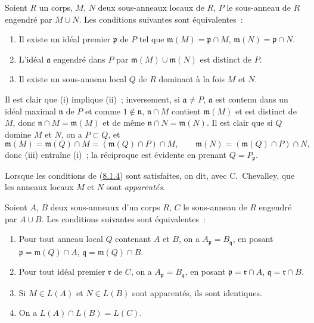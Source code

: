 \begin{lemma}[8.1.4]
\label{I.8.1.4-fr}
Soient $R$ un corps, $M$, $N$ deux sous-anneaux locaux de $R$, $P$ le
sous-anneau de $R$ engendré par $M\cup N$. Les conditions suivantes sont
équivalentes~:
\begin{enumerate}
  \item[(i)] Il existe un idéal premier $\mathfrak p$ de $P$ tel que
    $\mathfrak m(M)=\mathfrak p\cap M$,
    $\mathfrak m(N)=\mathfrak p\cap N$.
  \item[(ii)] L'idéal $\mathfrak a$ engendré dans $P$ par
    $\mathfrak m(M)\cup\mathfrak m(N)$ est distinct de $P$.
  \item[(iii)] Il existe un sous-anneau local $Q$ de $R$ dominant à la fois
    $M$ et $N$.
\end{enumerate}
\end{lemma}

Il est clair que (i) implique (ii)~; inversement, si $\mathfrak a\ne P$,
$\mathfrak a$ est contenu dans un idéal maximal $\mathfrak n$ de $P$ et comme
$1\notin\mathfrak n$, $\mathfrak n\cap M$ contient $\mathfrak m(M)$ et est
distinct de $M$, donc $\mathfrak n\cap M=\mathfrak m(M)$ et de même
$\mathfrak n\cap N=\mathfrak m(N)$. Il est clair que si $Q$ domine $M$ et
$N$, on a $P\subset Q$, et
\[
  \mathfrak m(M)=\mathfrak m(Q)\cap M
  =(\mathfrak m(Q)\cap P)\cap M,\qquad
  \mathfrak m(N)=(\mathfrak m(Q)\cap P)\cap N,
\]
donc (iii) entraîne (i)~; la réciproque est évidente en prenant
$Q=P_\mathfrak p$.

Lorsque les conditions de (\hyperref[I.8.1.4-fr]{8.1.4}) sont satisfaites,
on dit, avec C.~Chevalley, que les anneaux locaux $M$ et $N$ sont
\emph{apparentés}.

\begin{proposition}[8.1.5]
\label{I.8.1.5-fr}
Soient $A$, $B$ deux sous-anneaux d'un corps $R$, $C$ le sous-anneau de $R$
engendré par $A\cup B$. Les conditions suivantes sont équivalentes~:
\begin{enumerate}
  \item[(i)] Pour tout anneau local $Q$ contenant $A$ et $B$, on a
    $A_\mathfrak p=B_\mathfrak q$, en posant
    $\mathfrak p=\mathfrak m(Q)\cap A$,
    $\mathfrak q=\mathfrak m(Q)\cap B$.
  \item[(ii)] Pour tout idéal premier $\mathfrak r$ de $C$, on a
    $A_\mathfrak p=B_\mathfrak q$, en posant
    $\mathfrak p=\mathfrak r\cap A$, $\mathfrak q=\mathfrak r\cap B$.
  \item[(iii)] Si $M\in L(A)$ et $N\in L(B)$ sont apparentés, ils sont
    identiques.
  \item[(iv)] On a $L(A)\cap L(B)=L(C)$.
\end{enumerate}
\end{proposition}

